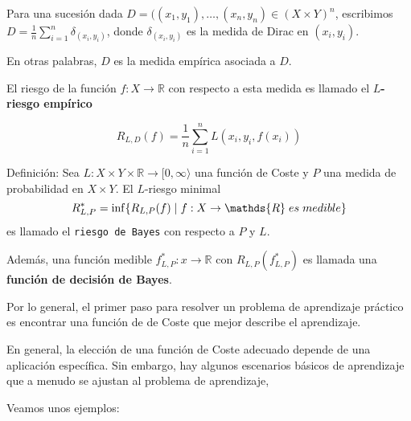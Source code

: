 \documentclass[utf8,spanish,xcolor={table,dvipsnames},12pt]{beamer}
\begin{document}
\begin{frame}
	


Para una sucesión dada $D=((x_{1},y_{1}),\ldots,(x_{n},y_{n})\in (X\times Y)^{n}$, escribimos $D=\frac{1}{n}\sum_{i=1}^{n}\delta_{(x_{i},y_{i})}$, donde $\delta_{(x_{i},y_{i})}$ es la medida de Dirac en $(x_{i},y_{i})$.

\vspace{0.2cm}

 En otras palabras, $D$ es la medida empírica asociada a $D$. 
 
 \vspace{0.2cm}
 
 El riesgo de la función $f: X\rightarrow\mathds{R}$ con respecto a esta medida es llamado el \textbf{$L$-riesgo empírico}

$$R_{L,D}(f)=\frac{1}{n}\sum_{i=1}^{n}L(x_{i},y_{i},f(x_{i}))$$
\end{frame}


\begin{frame}
\begin{block}{Definición:}
Sea $L: X\times Y \times \mathds{R} \rightarrow [0,\infty\rangle$ una función de Coste y $P$ una medida de probabilidad en $X\times Y$. El $L$-riesgo minimal
  $$R^{\ast}_{L,P}=\inf\{R_{L,P}(f) \hspace{0.1cm} |\hspace{0.1cm} f: X\rightarrow \mathds{R} \hspace{0.1cm} es \hspace{0.1cm} medible\}$$
  es llamado el \texttt{riesgo de Bayes} con respecto a $P$ y $L$.
  
 \vspace{0.2cm}
 
  Además, una función medible $f^{\ast}_{L,P} : x\rightarrow \mathds{R}$ con $R_{L,P}(f^{\ast}_{L,P})$ es llamada una \textbf{función de decisión de Bayes}.
\end{block}
\end{frame}


\begin{frame}
Por lo general, el primer paso para resolver un problema de aprendizaje práctico es encontrar una función de de Coste que mejor describe el aprendizaje.

\vspace{0.3cm}

 En general, la elección de una función  de Coste adecuado depende de una aplicación específica. Sin embargo, hay algunos escenarios básicos de aprendizaje que a menudo se ajustan al problema de aprendizaje,
 
 \vspace{0.2cm}
 
 Veamos unos ejemplos:
\end{frame}
\end{document}
